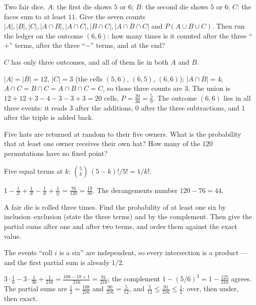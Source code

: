 \begin{problem}
Two fair dice. $A$: the first die shows $5$ or $6$; $B$: the second
die shows $5$ or $6$; $C$: the faces sum to at least $11$. Give the
seven counts $|A|, |B|, |C|, |A \cap B|, |A \cap C|, |B \cap C|,
|A \cap B \cap C|$ and $P(A \cup B \cup C)$. Then run the ledger on
the outcome $(6,6)$: how many times is it counted after the three
``$+$'' terms, after the three ``$-$'' terms, and at the end?
\begin{hint}
$C$ has only three outcomes, and all of them lie in both $A$ and $B$.
\end{hint}
\begin{solution}
$|A| = |B| = 12$, $|C| = 3$ (the cells $(5,6)$, $(6,5)$, $(6,6)$);
$|A \cap B| = 4$; $A \cap C = B \cap C = A \cap B \cap C = C$, so those
three counts are $3$. The union is $12 + 12 + 3 - 4 - 3 - 3 + 3 = 20$
cells, $P = \tfrac{20}{36} = \tfrac59$. The outcome $(6,6)$ lies in all
three events: it reads $3$ after the additions, $0$ after the three
subtractions, and $1$ after the triple is added back.
\end{solution}
\end{problem}

\begin{problem}
Five hats are returned at random to their five owners. What is the
probability that at least one owner receives their own hat? How many
of the $120$ permutations have no fixed point?
\begin{hint}
Five equal terms at $k$: $\binom{5}{k}\,(5-k)!/5! = 1/k!$.
\end{hint}
\begin{solution}
$1 - \tfrac1{2!} + \tfrac1{3!} - \tfrac1{4!} + \tfrac1{5!} =
\tfrac{76}{120} = \tfrac{19}{30}$. The derangements number $120 - 76
= 44$.
\end{solution}
\end{problem}

\begin{problem}
A fair die is rolled three times. Find the probability of at least
one six by inclusion–exclusion (state the three terms) and by the
complement. Then give the partial sums after one and after two terms,
and order them against the exact value.
\begin{hint}
The events ``roll $i$ is a six'' are independent, so every
intersection is a product — and the first partial sum is already
$1/2$.
\end{hint}
\begin{solution}
$3\cdot\tfrac16 - 3\cdot\tfrac1{36} + \tfrac1{216} = \tfrac{108 - 18 +
1}{216} = \tfrac{91}{216}$; the complement $1 - (5/6)^3 = 1 -
\tfrac{125}{216}$ agrees. The partial sums are $\tfrac12 =
\tfrac{108}{216}$ and $\tfrac{90}{216} = \tfrac5{12}$, and
$\tfrac5{12} \le \tfrac{91}{216} \le \tfrac12$: over, then under, then
exact.
\end{solution}
\end{problem}

